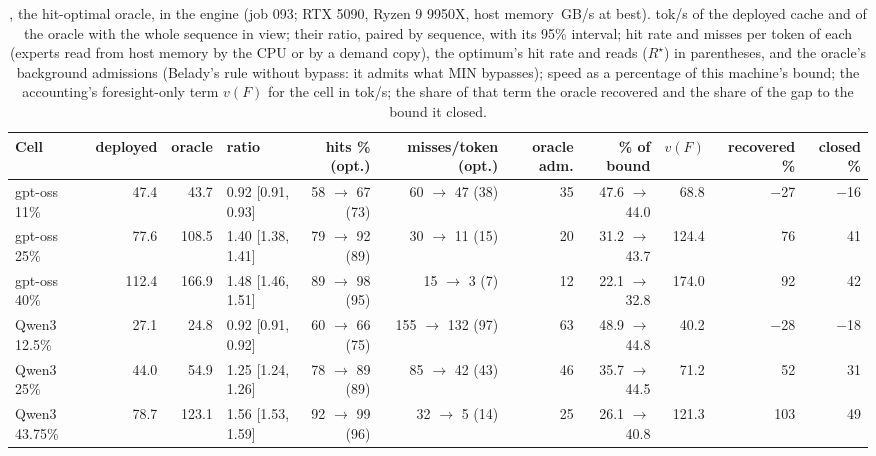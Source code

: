 \begin{table}[t]\centering\scriptsize\setlength{\tabcolsep}{3pt}
\caption{, the hit-optimal oracle, in the engine (job 093; RTX 5090, Ryzen 9 9950X, host memory \fsmHostMax\,GB/s at best). tok/s of the deployed cache and of the oracle with the whole sequence in view; their ratio, paired by sequence, with its 95\% interval; hit rate and misses per token of each (experts read from host memory by the CPU or by a demand copy), the optimum's hit rate and reads ($R^\star$) in parentheses, and the oracle's background admissions (Belady's rule without bypass: it admits what MIN bypasses); speed as a percentage of this machine's bound; the accounting's foresight-only term $v(F)$ for the cell in tok/s; the share of that term the oracle recovered and the share of the gap to the bound it closed.}
\label{tab:foresight}
\begin{tabular}{@{}lrrlrrrrrrr@{}}\toprule
Cell & deployed & oracle & ratio & hits \% (opt.) & misses/token (opt.) & oracle adm. & \% of bound & $v(F)$ & recovered \% & closed \% \\\midrule
gpt-oss 11\% & 47.4 & 43.7 & 0.92 [0.91, 0.93] & 58 $\to$ 67 (73) & 60 $\to$ 47 (38) & 35 & 47.6 $\to$ 44.0 & 68.8 & $-$27 & $-$16 \\
gpt-oss 25\% & 77.6 & 108.5 & 1.40 [1.38, 1.41] & 79 $\to$ 92 (89) & 30 $\to$ 11 (15) & 20 & 31.2 $\to$ 43.7 & 124.4 & 76 & 41 \\
gpt-oss 40\% & 112.4 & 166.9 & 1.48 [1.46, 1.51] & 89 $\to$ 98 (95) & 15 $\to$ 3 (7) & 12 & 22.1 $\to$ 32.8 & 174.0 & 92 & 42 \\
Qwen3 12.5\% & 27.1 & 24.8 & 0.92 [0.91, 0.92] & 60 $\to$ 66 (75) & 155 $\to$ 132 (97) & 63 & 48.9 $\to$ 44.8 & 40.2 & $-$28 & $-$18 \\
Qwen3 25\% & 44.0 & 54.9 & 1.25 [1.24, 1.26] & 78 $\to$ 89 (89) & 85 $\to$ 42 (43) & 46 & 35.7 $\to$ 44.5 & 71.2 & 52 & 31 \\
Qwen3 43.75\% & 78.7 & 123.1 & 1.56 [1.53, 1.59] & 92 $\to$ 99 (96) & 32 $\to$ 5 (14) & 25 & 26.1 $\to$ 40.8 & 121.3 & 103 & 49 \\
\bottomrule\end{tabular}\end{table}
